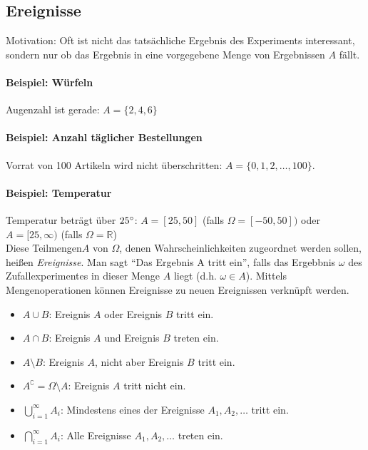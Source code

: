 \subsection{Ereignisse}
Motivation: Oft ist nicht das tatsächliche Ergebnis des Experiments interessant, sondern nur
ob das Ergebnis in eine vorgegebene Menge von Ergebnissen $A$ fällt.

\paragraph{Beispiel: Würfeln} Augenzahl ist gerade: $A = \{2,4,6\}$

\paragraph{Beispiel: Anzahl täglicher Bestellungen} Vorrat von 100 Artikeln wird nicht
überschritten: $A = \{0,1,2,\dots,100\}$.

\paragraph{Beispiel: Temperatur} Temperatur beträgt über $25\degree$:
$A = [25,50]$ (falls $\Omega = [-50,50])$ oder $A= [25, \infty)$ (falls $\Omega = \mathbb{R}$)
\\

Diese Teilmengen$A$ von $\Omega$, denen Wahrscheinlichkeiten zugeordnet werden sollen,
heißen \emph{Ereignisse}.
Man sagt \enquote{Das Ergebnis A tritt ein}, falls das Ergebbnis $\omega$ des Zufallexperimentes
in dieser Menge $A$ liegt (d.h. $\omega \in A$).
Mittels Mengenoperationen können Ereignisse zu neuen Ereignissen verknüpft werden.

\begin{itemize}
    \item $A \cup B$: Ereignis $A$ oder Ereignis $B$ tritt ein.

    \item $A \cap B$: Ereignis $A$ und Ereignis $B$ treten ein.

    \item $A\setminus B$: Ereignis $A$, nicht aber Ereignis $B$ tritt ein.

    \item $A^\complement = \Omega\setminus A$: Ereignis $A$ tritt nicht ein.

    \item $\bigcup\limits_{i=1}^\infty A_i$: Mindestens eines der Ereignisse
        $A_1, A_2, \dots$ tritt ein.

    \item $\bigcap\limits_{i=1}^\infty A_i$: Alle Ereignisse $A_1, A_2, \dots$
        treten ein.
\end{itemize}

